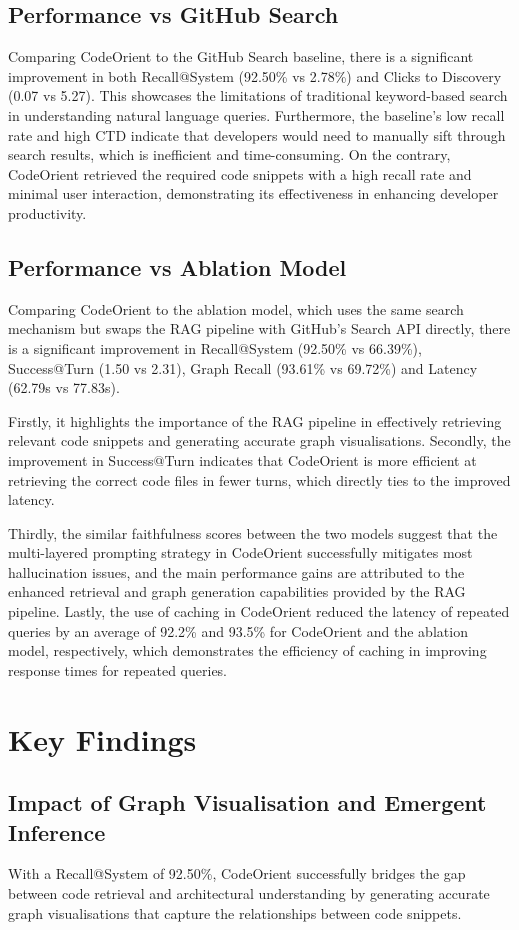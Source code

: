 \subsection{Performance vs GitHub Search}
Comparing CodeOrient to the GitHub Search baseline, there is a significant improvement in both Recall@System (92.50\% vs 2.78\%) and Clicks to Discovery (0.07 vs 5.27). This showcases the limitations of traditional keyword-based search in understanding natural language queries. Furthermore, the baseline's low recall rate and high CTD indicate that developers would need to manually sift through search results, which is inefficient and time-consuming. On the contrary, CodeOrient retrieved the required code snippets with a high recall rate and minimal user interaction, demonstrating its effectiveness in enhancing developer productivity.
\subsection{Performance vs Ablation Model}
Comparing CodeOrient to the ablation model, which uses the same search mechanism but swaps the RAG pipeline with GitHub's Search API directly, there is a significant improvement in Recall@System (92.50\% vs 66.39\%), Success@Turn (1.50 vs 2.31), Graph Recall (93.61\% vs 69.72\%) and Latency (62.79s vs 77.83s). 

Firstly, it highlights the importance of the RAG pipeline in effectively retrieving relevant code snippets and generating accurate graph visualisations. Secondly, the improvement in Success@Turn indicates that CodeOrient is more efficient at retrieving the correct code files in fewer turns, which directly ties to the improved latency.

Thirdly, the similar faithfulness scores between the two models suggest that the multi-layered prompting strategy in CodeOrient successfully mitigates most hallucination issues, and the main performance gains are attributed to the enhanced retrieval and graph generation capabilities provided by the RAG pipeline. Lastly, the use of caching in CodeOrient reduced the latency of repeated queries by an average of 92.2\% and 93.5\% for CodeOrient and the ablation model, respectively, which demonstrates the efficiency of caching in improving response times for repeated queries.

\section{Key Findings}
\subsection{Impact of Graph Visualisation and Emergent Inference}
With a Recall@System of 92.50\%, CodeOrient successfully bridges the gap between code retrieval and architectural understanding by generating accurate graph visualisations that capture the relationships between code snippets.

